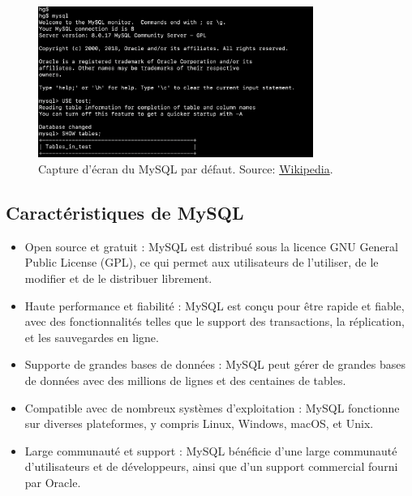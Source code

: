 \documentclass{article}
\begin{document}
\begin{figure}[H]
  \centering
  \includegraphics[width=0.8\textwidth]{img/mysqlPres.PNG}
  \caption{Capture d'écran du MySQL par défaut. Source: \href{https://en.wikipedia.org/wiki/MySQL}{Wikipedia}.}
  \label{fig:mysql-image}
\end{figure}

\subsection{Caractéristiques de MySQL}
\begin{itemize}
  \item Open source et gratuit : MySQL est distribué sous la licence GNU General Public License (GPL), ce qui permet aux utilisateurs de l'utiliser, de le modifier et de le distribuer librement.
  \item Haute performance et fiabilité : MySQL est conçu pour être rapide et fiable, avec des fonctionnalités telles que le support des transactions, la réplication, et les sauvegardes en ligne.
  \item Supporte de grandes bases de données : MySQL peut gérer de grandes bases de données avec des millions de lignes et des centaines de tables.
  \item Compatible avec de nombreux systèmes d'exploitation : MySQL fonctionne sur diverses plateformes, y compris Linux, Windows, macOS, et Unix.
  \item Large communauté et support : MySQL bénéficie d'une large communauté d'utilisateurs et de développeurs, ainsi que d'un support commercial fourni par Oracle.
\end{itemize}
\end{document}
